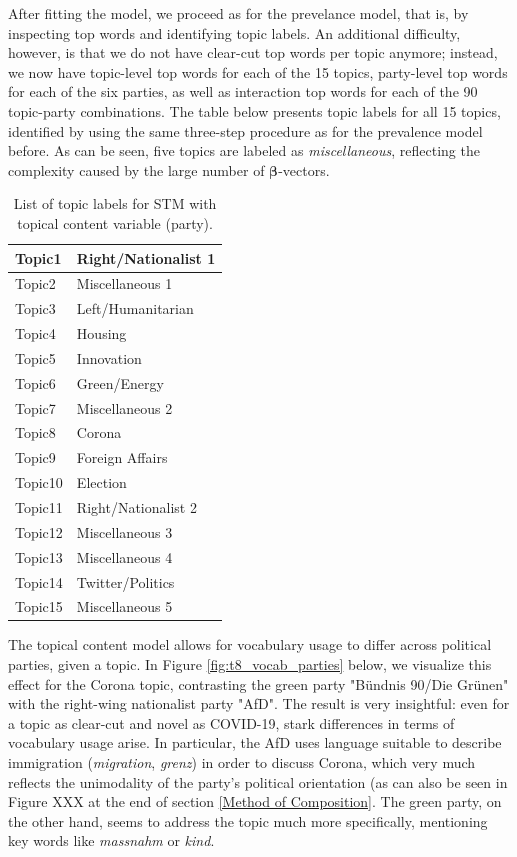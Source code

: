 After fitting the model, we proceed as for the prevelance model, that is, by inspecting top words and identifying topic labels. An additional difficulty, however, is that we do not have clear-cut top words per topic anymore; instead, we now have topic-level top words for each of the 15 topics, party-level top words for each of the six parties, as well as interaction top words for each of the 90 topic-party combinations. The table below presents topic labels for all 15 topics, identified by using the same three-step procedure as for the prevalence model before. As can be seen, five topics are labeled as \textit{miscellaneous}, reflecting the complexity caused by the large number of $\boldsymbol{\beta}$-vectors.

\begin{table}[h!]
	\centering
	\captionsetup{justification=centering,margin=2cm}
	\begin{tabular}{|l|l|}
	\hline
	Topic1  & Right/Nationalist 1  \\ \hline
	Topic2  & Miscellaneous 1      \\ \hline
	Topic3  & Left/Humanitarian    \\ \hline
	Topic4  & Housing       	   \\ \hline
	Topic5  & Innovation           \\ \hline
	Topic6  & Green/Energy         \\ \hline
	Topic7  & Miscellaneous 2      \\ \hline
	Topic8  & Corona               \\ \hline
	Topic9  & Foreign Affairs      \\ \hline
	Topic10 & Election             \\ \hline
	Topic11 & Right/Nationalist 2  \\ \hline
	Topic12 & Miscellaneous 3      \\ \hline
	Topic13 & Miscellaneous 4      \\ \hline
	Topic14 & Twitter/Politics     \\ \hline
	Topic15 & Miscellaneous 5      \\ \hline
	\end{tabular}
	\caption{List of topic labels for STM with topical content variable (party).}
	\label{Tab:labels_content}
\end{table}

The topical content model allows for vocabulary usage to differ across political parties, given a topic. In Figure \ref{fig:t8_vocab_parties} below, we visualize this effect for the Corona topic, contrasting the green party "Bündnis 90/Die Grünen" with the right-wing nationalist party "AfD". The result is very insightful: even for a topic as clear-cut and novel as COVID-19, stark differences in terms of vocabulary usage arise. In particular, the AfD uses language suitable to describe immigration (\textit{migration}, \textit{grenz}) in order to discuss Corona, which very much reflects the unimodality of the party's political orientation (as can also be seen in Figure XXX at the end of section \ref{Method of Composition}. The green party, on the other hand, seems to address the topic much more specifically, mentioning key words like \textit{massnahm} or \textit{kind}.

